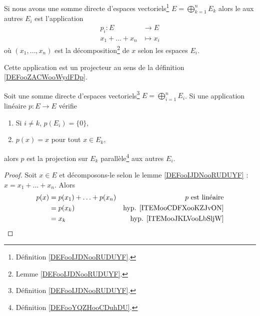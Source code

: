 \begin{definition}		\label{DEFooYQZHooCDuhDU}
	Si nous avons une somme directe d'espaces vectoriels\footnote{Définition \ref{DEFooIJDNooRUDUYF}.} \( E=\bigoplus_{k=1}^nE_k\) alors le  aux autres \( E_i\) est l'application
	\begin{equation}
		\begin{aligned}
			p_i\colon E    & \to E       \\
			x_1+\ldots+x_n & \mapsto x_i
		\end{aligned}
	\end{equation}
	où \( (x_1,\ldots,x_n)\) est la décomposition\footnote{Lemme \ref{DEFooIJDNooRUDUYF}.} de \( x\) selon les espaces \( E_i\).

	Cette application est un projecteur au sens de la définition \ref{DEFooZACWooWydFDp}.
\end{definition}

\begin{lemma}	\label{LEMooCFDYooHTroSi}
	Soit une somme directe d'espaces vectoriels\footnote{Définition \ref{DEFooIJDNooRUDUYF}.} \( E=\bigoplus_{i=1}^nE_i\). Si une application linéaire \(p \colon E\to E  \) vérifie
	\begin{enumerate}
		\item		\label{ITEMooCDFXooKZJvON}
		      Si \( i\neq k\), \( p(E_i)=\{ 0 \}\),
		\item		\label{ITEMooJKLVooLbSljW}
		      \( p(x)=x\) pour tout \( x\in E_k\),
	\end{enumerate}
	alors \( p\) est la projection sur \( E_k\) parallèle\footnote{Définition \ref{DEFooYQZHooCDuhDU}.} aux autres \( E_i\).
\end{lemma}

\begin{proof}
	Soit \( x\in E\) et décomposons-le selon le lemme \ref{DEFooIJDNooRUDUYF} : \( x=x_1+\ldots+x_n\). Alors
	\begin{subequations}
		\begin{align}
			p(x) & =p(x_1)+\ldots+p(x_n) & \text{\( p\) est linéaire}           \\
			     & =p(x_k)               & \text{hyp. \ref{ITEMooCDFXooKZJvON}} \\
			     & =x_k                  & \text{hyp. \ref{ITEMooJKLVooLbSljW}} \\
		\end{align}
	\end{subequations}
\end{proof}

